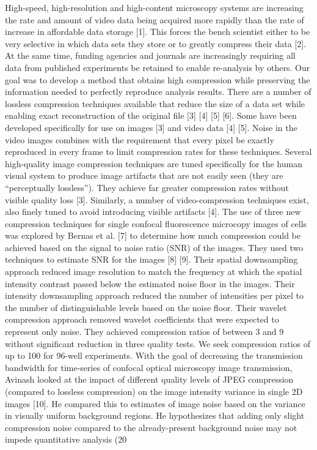 High-speed, high-resolution and high-content microscopy systems are increasing the rate and amount of video data being acquired more rapidly than the rate of increase in affordable data storage [1].  This forces the bench scientist either to be very selective in which data sets they store or to greatly compress their data [2].  At the same time, funding agencies and journals are increasingly requiring all data from published experiments be retained to enable re-analysis by others.  Our goal was to develop a method that obtains high compression while preserving the information needed to perfectly reproduce analysis results.
There are a number of lossless compression techniques available that reduce the size of a data set while enabling exact reconstruction of the original file [3] [4] [5] [6].  Some have been developed specifically for use on images [3] and video data [4] [5].  Noise in the video images combines with the requirement that every pixel be exactly reproduced in every frame to limit compression rates for these techniques.
Several high-quality image compression techniques are tuned specifically for the human visual system to produce image artifacts that are not easily seen (they are “perceptually lossless”).  They achieve far greater compression rates without visible quality loss [3].  Similarly, a number of video-compression techniques exist, also finely tuned to avoid introducing visible artifacts [4].
The use of three new compression techniques for single confocal fluorescence microcopy images of cells was explored by Bernas et al. [7] to determine how much compression could be achieved based on the signal to noise ratio (SNR) of the images.  They used two techniques to estimate SNR for the images [8] [9]. Their spatial downsampling approach reduced image resolution to match the frequency at which the spatial intensity contrast passed below the estimated noise floor in the images.  Their intensity downsampling approach reduced the number of intensities per pixel to the number of distinguishable levels based on the noise floor.  Their wavelet compression approach removed wavelet coefficients that were expected to represent only noise.  They achieved compression ratios of between 3 and 9 without significant reduction in three quality tests.  We seek compression ratios of up to 100 for 96-well experiments.
With the goal of decreasing the transmission bandwidth for time-series of confocal optical microscopy image transmission, Avinash looked at the impact of different quality levels of JPEG compression (compared to lossless compression) on the image intensity variance in single 2D images [10].  He compared this to estimates of image noise based on the variance in visually uniform background regions.  He hypothesizes that adding only slight compression noise compared to the already-present background noise may not impede quantitative analysis (20%

